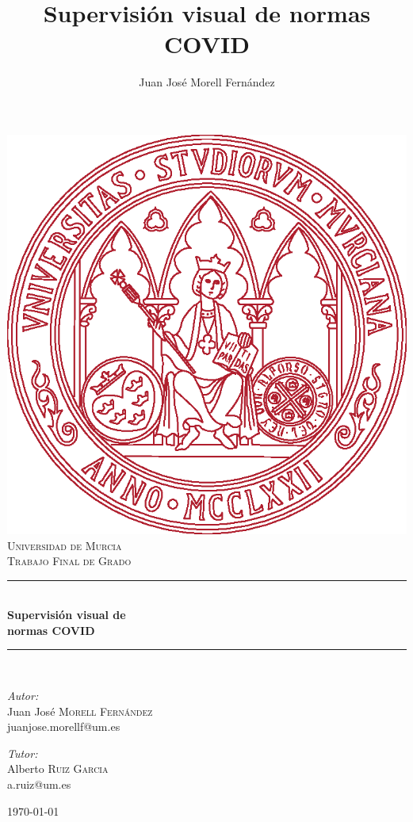 \documentclass[a4paper,12pt]{book}
\newcommand{\HRule}{\rule{\linewidth}{0.5mm}}
\begin{document}
\title{Supervisión visual de normas COVID}
\author{Juan José Morell Fernández}

\begin{titlepage}
 
\begin{center}
 
\vfill

\includegraphics[height=0.5\textwidth]{imagenes/escudo}\\[2.5cm]
 
\textsc{\LARGE Universidad de Murcia}\\[0.5cm]
 
\textsc{\Large Trabajo Final de Grado}\\[0.5cm]
 
\HRule \\[0.4cm]
{ \huge \bfseries Supervisión visual de}\\[0.4cm]
{ \huge \bfseries normas COVID}\\[0.4cm]
\HRule \\[1.5cm]
 
\begin{minipage}{0.4\textwidth}
\begin{flushleft} \large
\emph{Autor:}\\
Juan José \textsc{Morell Fernández}\\
juanjose.morellf@um.es
\end{flushleft}
\end{minipage}
\begin{minipage}{0.4\textwidth}
\begin{flushright} \large
\emph{Tutor:} \\
Alberto \textsc{Ruiz Garcia}\\
a.ruiz@um.es
\end{flushright}
\end{minipage}
 
\vfill
 
{\large \today}
 
\end{center}
 
\end{titlepage}
\end{document}
